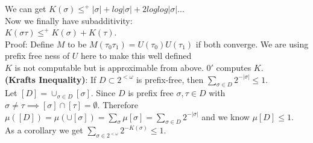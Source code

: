 \documentclass{article}
\begin{document}
	We can get $K(\sigma) \leq^+ |\sigma| + log|\sigma| + 2log log|\sigma|...$\\
	Now we finally have subadditivity:\\
	$K(\sigma \tau) \leq^+ K(\sigma) + K(\tau)$.\\
	Proof: Define $M$ to be $M(\tau_0\tau_1) = U(\tau_0) U(\tau_1)$ if both converge. We are using prefix free ness of $U$ here to make this well defined\\
	$K$ is not computable but is approximable from above. $0'$ computes $K$.\\
	\textbf{(Krafts Inequality)}: If $D \subset 2^{<\omega}$ is prefix-free, then $\sum_{\sigma \in D} 2^{-|\sigma|} \leq 1$.\\
	Let $[D] = \cup_{\sigma \in D} [\sigma]$. Since $D$ is prefix free $\sigma,\tau \in D$ with $\sigma \neq \tau \implies [\sigma] \cap [\tau]  = \emptyset$. Therefore $\mu([D]) = \mu(\cup [\sigma]) = \sum_\sigma \mu[\sigma] = \sum_{\sigma \in D} 2^{-|\sigma|}$ and we know $\mu[D] \leq 1$.\\
	As a corollary we get $\sum_{\sigma \in 2^{< \omega}} 2^{-K(\sigma)} \leq 1$.
\end{document}
